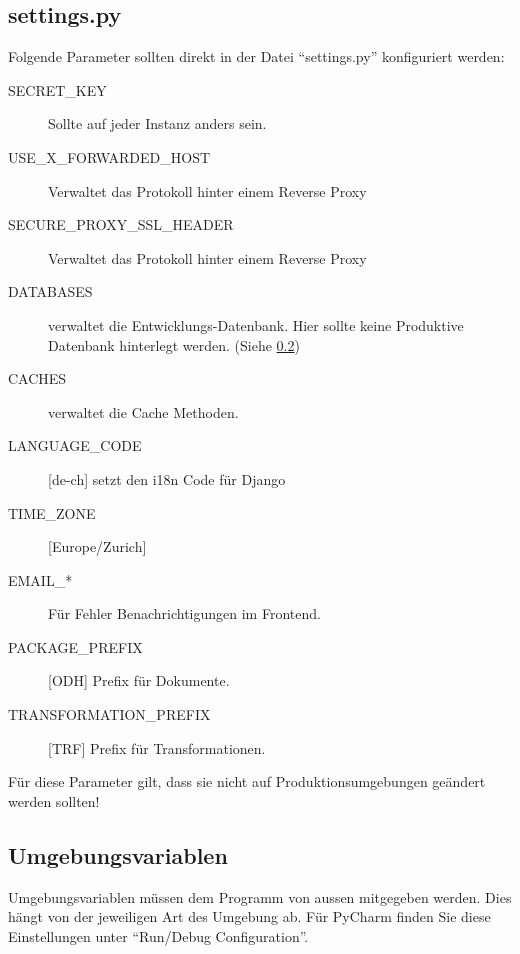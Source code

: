 \subsection{settings.py}
Folgende Parameter sollten direkt in der Datei ``settings.py'' konfiguriert werden:
\begin{description}
\item[SECRET\_KEY] Sollte auf jeder Instanz anders sein.
\item[USE\_X\_FORWARDED\_HOST] Verwaltet das Protokoll hinter einem Reverse Proxy
\item[SECURE\_PROXY\_SSL\_HEADER] Verwaltet das Protokoll hinter einem Reverse Proxy
\item[DATABASES] verwaltet die Entwicklungs-Datenbank. Hier sollte keine Produktive Datenbank hinterlegt werden. (Siehe \cref{sec:sd:umgebungsvariablen})
\item[CACHES] verwaltet die Cache Methoden.
\item[LANGUAGE\_CODE]{[}de-ch{]} setzt den \acs{i18n} Code für Django
\item[TIME\_ZONE]{[}Europe/Zurich{]}

\item[EMAIL\_*] Für Fehler Benachrichtigungen im Frontend.
\item[PACKAGE\_PREFIX]{[}ODH{]} Prefix für Dokumente. 
\item[TRANSFORMATION\_PREFIX]{[}TRF{]} Prefix für Transformationen.
\end{description}
Für diese Parameter gilt, dass sie nicht auf Produktionsumgebungen geändert werden sollten!
\subsection{Umgebungsvariablen} \label{sec:sd:umgebungsvariablen}
Umgebungsvariablen müssen dem Programm von aussen mitgegeben werden. Dies hängt von der jeweiligen Art des Umgebung ab. Für PyCharm finden Sie diese Einstellungen unter ``Run/Debug Configuration''.


